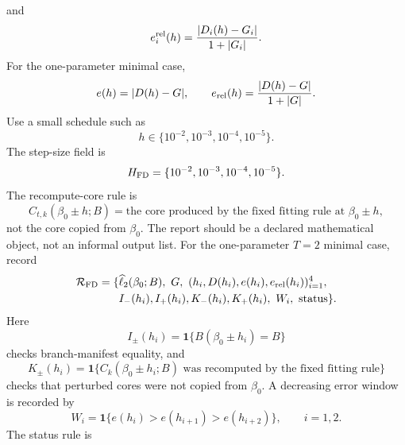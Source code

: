 \documentclass[11pt]{article}
\numberwithin{equation}{section}
\newcommand{\ind}{\mathbf 1}
\newcommand{\widehatell}{\widehat\ell}
\begin{document}
and
\begin{equation}
    e_i^{\rm rel}(h)
    =
    \frac{|D_i(h)-G_i|}{1+|G_i|}.
    \label{eq:p24-p19-99}
\end{equation}
For the one-parameter minimal case,
\begin{equation}
    e(h)=|D(h)-G|,
    \qquad
    e_{\rm rel}(h)=\frac{|D(h)-G|}{1+|G|}.
    \label{eq:p24-p22-fd0c}
\end{equation}
Use a small schedule such as
\begin{equation}
    h\in\{10^{-2},10^{-3},10^{-4},10^{-5}\}.
    \label{eq:p24-p19-100}
\end{equation}
The step-size field is
\begin{equation}
    H_{\rm FD}=\{10^{-2},10^{-3},10^{-4},10^{-5}\}.
    \label{eq:p24-p22-fd0d}
\end{equation}
The recompute-core rule is
\begin{equation}
    C_{t,k}(\beta_0\pm h;B)
    =
    \text{the core produced by the fixed fitting rule at }\beta_0\pm h,
    \label{eq:p24-p22-fd0e}
\end{equation}
not the core copied from \(\beta_0\).
The report should be a declared mathematical object, not an informal output
list.
For the one-parameter \(T=2\) minimal case, record
\begin{equation}
\begin{aligned}
    \mathcal R_{\rm FD}
    =
    \{&
    \widehatell_2(\beta_0;B),\
    G,\
    (h_i,D(h_i),e(h_i),e_{\rm rel}(h_i))_{i=1}^{4},\\
    &I_-(h_i),I_+(h_i),K_-(h_i),K_+(h_i),\
    W_i,\ \text{status}\}.
\end{aligned}
\label{eq:p24-p22-fd1}
\end{equation}
Here
\begin{equation}
    I_\pm(h_i)
    =
    \ind\{B(\beta_0\pm h_i)=B\}
    \label{eq:p24-p22-fd2}
\end{equation}
checks branch-manifest equality, and
\begin{equation}
    K_\pm(h_i)
    =
    \ind\{C_k(\beta_0\pm h_i;B)
    \text{ was recomputed by the fixed fitting rule}\}
    \label{eq:p24-p22-fd3}
\end{equation}
checks that perturbed cores were not copied from \(\beta_0\).  A decreasing
error window is recorded by
\begin{equation}
    W_i=\ind\{e(h_i)>e(h_{i+1})>e(h_{i+2})\},
    \qquad i=1,2.
    \label{eq:p24-p22-fd4}
\end{equation}
The status rule is
\end{document}
